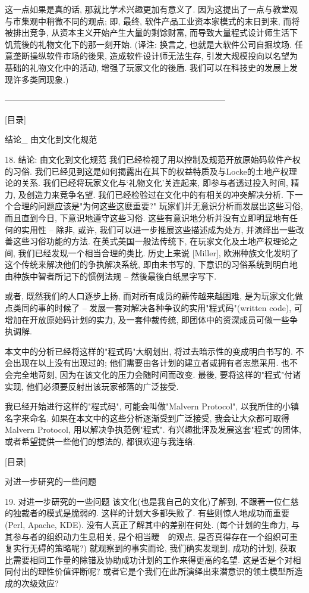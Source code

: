 \documentclass[a4paper,12pt,UTF8,twoside]{ctexbook}
\begin{document}
这一点如果是真的话, 那就比学术兴趣更加有意义了.  因为这提出了一点与教堂观与市集观中稍微不同的观点; 即, 最终, 软件产品工业资本家模式的末日到来, 而将被排出竞争, 从资本主义开始产生大量的剩馀财富, 而导致大量程式设计师生活下饥荒後的礼物文化下的那一刻开始. (译注: 换言之, 也就是大软件公司自掘坟场. 任意垄断操纵软件市场的後果, 造成软件设计师无法生存, 引发大规模投向以名望为基础的礼物文化中的活动, 增强了玩家文化的後盾. 我们可以在科技史的发展上发现许多类同现象.)

--------------------------------------------------------------------------------

[目录]

结论_ 由文化到文化规范

18. 结论: 由文化到文化规范
我们已经检视了用以控制及规范开放原始码软件产权的习俗. 我们已经见到这是如何揭露出在其下的权益特质及与Locke的土地产权理论的关系. 我们已经将玩家文化与`礼物文化'关连起来, 即参与者透过投入时间, 精力, 及创造力来竞争名望. 我们已经检验过在文化中的有相关的冲突解决分析.
下一个合理的问题应该是"为何这些这麽重要?" 玩家们并无意识分析而发展出这些习俗, 而且直到今日, 下意识地遵守这些习俗. 这些有意识地分析并没有立即明显地有任何的实用性 -- 除非, 或许, 我们可以进一步推展这些描述成为处方, 并演绎出一些改善这些习俗功能的方法.
在英式美国一般法传统下, 在玩家文化及土地产权理论之间, 我们已经发现一个相当合理的类比. 历史上来说 [Miller], 欧洲种族文化发明了这个传统来解决他们的争执解决系统, 即由未书写的, 下意识的习俗系统到明白地由种族中智者所记下的惯例法规 -- 然後最後白纸黑字写下.

或者, 既然我们的人口逐步上扬, 而对所有成员的薪传越来越困难, 是为玩家文化做点类同的事的时候了 -- 发展一套对解决各种争议的实用"程式码"(written code), 可增加在开放原始码计划的实力, 及一套仲裁传统, 即团体中的资深成员可做一些争执调解.

本文中的分析已经将这样的"程式码"大纲划出, 将过去暗示性的变成明白书写的. 不会出现在以上没有出现过的; 他们需要由各计划的建立者或拥有者志愿采用. 也不会完全地苛刻, 因为在该文化的压力会随时间而改变. 最後, 要将这样的"程式"付诸实现, 他们必须要反射出该玩家部落的广泛接受.

我已经开始进行这样的"程式码", 可能会叫做"Malvern Protocol", 以我所住的小镇名字来命名. 如果在本文中的这些分析逐渐受到广泛接受, 我会让大众都可取得Malvern Protocol, 用以解决争执范例"程式". 有兴趣批评及发展这套"程式"的团体, 或者希望提供一些他们的想法的, 都很欢迎与我连络.


[目录]

对进一步研究的一些问题

19. 对进一步研究的一些问题
该文化(也是我自己的文化)了解到, 不跟著一位仁慈的独裁者的模式是脆弱的. 这样的计划大多都失败了. 有些则惊人地成功而重要(Perl, Apache, KDE). 没有人真正了解其中的差别在何处. (每个计划的生命力, 与其参与者的组织动力生息相关, 是个相当暧　的观点, 是否真得存在一个组织可重复实行无碍的策略呢?)
就观察到的事实而论, 我们确实发现到, 成功的计划, 获取比需要相同工作量的除错及协助成功计划的工作来得更高的名望. 这是否是个对相同付出的理性价值评断呢?  或者它是个我们在此所演绎出来潜意识的领土模型所造成的次级效应?
\end{document}
